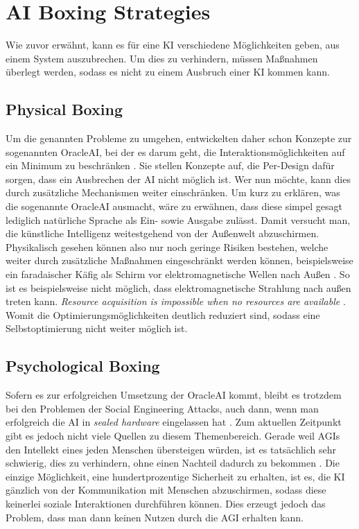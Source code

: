     \section{AI Boxing Strategies}
        Wie zuvor erwähnt, kann es für eine KI verschiedene Möglichkeiten geben, aus einem System auszubrechen. Um dies
        zu verhindern, müssen Maßnahmen überlegt werden, sodass es nicht zu einem Ausbruch einer KI kommen kann.

        \subsection{Physical Boxing}

        Um die genannten Probleme zu umgehen, entwickelten daher schon \citeauthor{armstrongforthcoming} Konzepte zur
        sogenannten OracleAI, bei der es darum geht, die Interaktionsmöglichkeiten auf ein Minimum zu beschränken
        \cite{armstrongforthcoming}. Sie stellen Konzepte auf, die Per-Design dafür sorgen, dass ein Ausbrechen der AI
        nicht möglich ist. Wer nun möchte, kann dies durch zusätzliche Mechanismen weiter einschränken. Um kurz zu
        erklären, was die sogenannte OracleAI ausmacht, wäre zu erwähnen, dass diese simpel gesagt lediglich natürliche
        Sprache als Ein- sowie Ausgabe zulässt. Damit versucht man, die künstliche Intelligenz weitestgehend von der
        Außenwelt abzuschirmen. Physikalisch gesehen können also nur noch geringe Risiken bestehen, welche weiter durch
        zusätzliche Maßnahmen eingeschränkt werden können, beispielsweise ein faradaischer Käfig als Schirm vor
        elektromagnetische Wellen nach Außen \cite[s. 308]{armstrongforthcoming}. So ist es beispielsweise nicht möglich,
        dass elektromagnetische Strahlung nach außen treten kann.
        \textit{Resource acquisition is impossible when no resources are available} \cite[s. 4]{ebhardt2018threat}.
        Womit die Optimierungsmöglichkeiten deutlich reduziert sind, sodass eine Selbstoptimierung nicht weiter möglich ist.

        \subsection{Psychological Boxing}

        Sofern es zur erfolgreichen Umsetzung der OracleAI kommt, bleibt es trotzdem bei den Problemen der Social
        Engineering Attacks, auch dann, wenn man erfolgreich die AI in \textit{sealed hardware} eingelassen hat \cite[s. 4]{ebhardt2018threat}.
        Zum aktuellen Zeitpunkt gibt es jedoch nicht viele Quellen zu diesem Themenbereich. Gerade weil AGIs den Intellekt
        eines jeden Menschen übersteigen würden, ist es tatsächlich sehr schwierig, dies zu verhindern, ohne einen Nachteil
        dadurch zu bekommen \cite[s. 204]{yampolskiy2012leakproofing}. Die einzige Möglichkeit, eine hundertprozentige Sicherheit
        zu erhalten, ist es, die KI gänzlich von der Kommunikation mit Menschen abzuschirmen, sodass diese keinerlei
        soziale Interaktionen durchführen können. Dies erzeugt jedoch das Problem, dass man dann keinen Nutzen durch
        die AGI erhalten kann.

